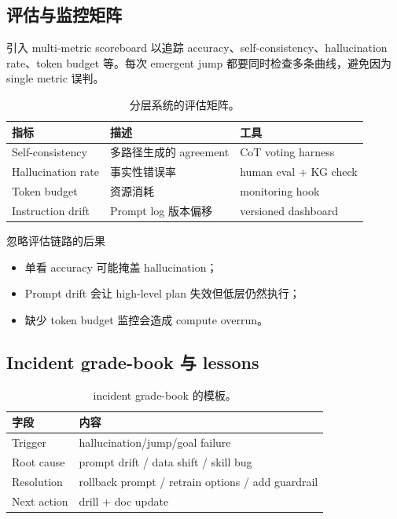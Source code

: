 \documentclass[a4paper]{article}
\begin{document}
\subsection{评估与监控矩阵}

引入 multi-metric scoreboard 以追踪 accuracy、self-consistency、hallucination rate、token budget 等。每次 emergent jump 都要同时检查多条曲线，避免因为 single metric 误判。

\begin{table}[H]
\centering
\begin{tabular}{p{3.5cm}p{5cm}p{3cm}}
\toprule
指标 & 描述 & 工具 \\
\midrule
Self-consistency & 多路径生成的 agreement & CoT voting harness \\
Hallucination rate & 事实性错误率 & human eval + KG check \\
Token budget & 资源消耗 & monitoring hook \\
Instruction drift & Prompt log 版本偏移 & versioned dashboard \\
\bottomrule
\end{tabular}
\caption{分层系统的评估矩阵。}
\end{table}

\begin{warningbox}{忽略评估链路的后果}
\begin{itemize}
    \item 单看 accuracy 可能掩盖 hallucination；
    \item Prompt drift 会让 high-level plan 失效但低层仍然执行；
    \item 缺少 token budget 监控会造成 compute overrun。
\end{itemize}
\end{warningbox}

\subsection{Incident grade-book 与 lessons}

\begin{table}[H]
\centering
\begin{tabular}{p{4cm}p{6cm}}
\toprule
字段 & 内容 \\
\midrule
Trigger & hallucination/jump/goal failure \\
Root cause & prompt drift / data shift / skill bug \\
Resolution & rollback prompt / retrain options / add guardrail \\
Next action & drill + doc update \\
\bottomrule
\end{tabular}
\caption{incident grade-book 的模板。}
\end{table}
\end{document}
